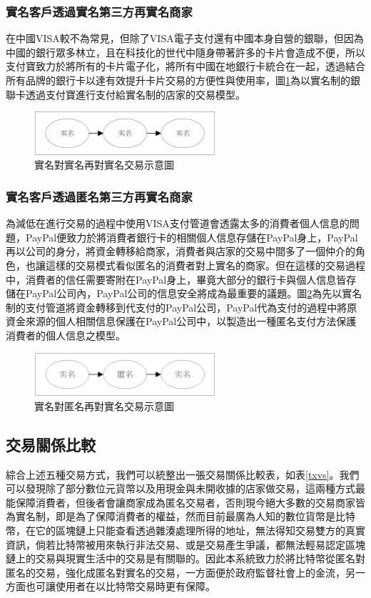 		\subsubsection{實名客戶透過實名第三方再實名商家}
		在中國VISA較不為常見，但除了VISA電子支付還有中國本身自營的銀聯，但因為中國的銀行眾多林立，且在科技化的世代中隨身帶著許多的卡片會造成不便，所以支付寶致力於將所有的卡片電子化，將所有中國在地銀行卡統合在一起，透過結合所有品牌的銀行卡以達有效提升卡片交易的方便性與使用率，圖\ref{modennn}為以實名制的銀聯卡透過支付寶進行支付給實名制的店家的交易模型。

		\begin{figure}[!htbp]
			\centering
			\includegraphics[width = 0.6\textwidth]{modennn.png}
			\caption{實名對實名再對實名交易示意圖}\label{modennn}
		\end{figure}

		\subsubsection{實名客戶透過匿名第三方再實名商家}
		為減低在進行交易的過程中使用VISA支付管道會透露太多的消費者個人信息的問題，PayPal便致力於將消費者銀行卡的相關個人信息存儲在PayPal身上，PayPal再以公司的身分，將資金轉移給商家，消費者與店家的交易中間多了一個仲介的角色，也讓這樣的交易模式看似匿名的消費者對上實名的商家。但在這樣的交易過程中，消費者的信任需要寄附在PayPal身上，畢竟大部分的銀行卡與個人信息皆存儲在PayPal公司內，PayPal公司的信息安全將成為最重要的議題。圖\ref{modenan}為先以實名制的支付管道將資金轉移到代支付的PayPal公司，PayPal代為支付的過程中將原資金來源的個人相關信息保護在PayPal公司中，以製造出一種匿名支付方法保護消費者的個人信息之模型。

		\begin{figure}[!htbp]
			\centering
			\includegraphics[width = 0.6\textwidth]{modenan.png}
			\caption{實名對匿名再對實名交易示意圖}\label{modenan}
		\end{figure}

		\subsection{交易關係比較}
		綜合上述五種交易方式，我們可以統整出一張交易關係比較表，如表\ref{txvs}。我們可以發現除了部分數位元貨幣以及用現金與未開收據的店家做交易，這兩種方式最能保障消費者，但後者會讓商家成為匿名交易者，否則現今絕大多數的交易商家皆為實名制，即是為了保障消費者的權益，然而目前最廣為人知的數位貨幣是比特幣，在它的區塊鏈上只能查看透過雜湊處理所得的地址，無法得知交易雙方的真實資訊，倘若比特幣被用來執行非法交易、或是交易產生爭議，都無法輕易認定區塊鏈上的交易與現實生活中的交易是有關聯的。因此本系統致力於將比特幣從匿名對匿名的交易，強化成匿名對實名的交易，一方面便於政府監督社會上的金流，另一方面也可讓使用者在以比特幣交易時更有保障。

